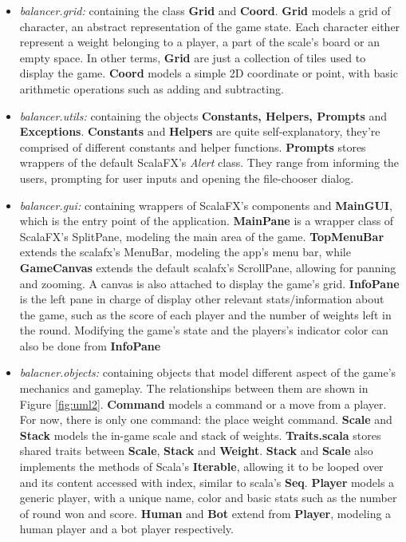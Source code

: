 \documentclass[12pt]{article}
\begin{document}
\begin{itemize}

  \item \textit{balancer.grid:} containing the class \textbf{Grid} and
    \textbf{Coord}. \textbf{Grid} models a grid of character, an abstract
    representation of the game state. Each character either represent a weight
    belonging to a player, a part of the scale's board or an empty space. In
    other terms, \textbf{Grid} are just a collection of tiles used to display
    the game. \textbf{Coord} models a simple 2D coordinate or point, with basic
    arithmetic operations such as adding and subtracting.

  \item \textit{balancer.utils:} containing the objects \textbf{Constants, Helpers,
    Prompts} and \textbf{Exceptions}. \textbf{Constants} and \textbf{Helpers}
    are quite self-explanatory, they're comprised of different constants and
    helper functions. \textbf{Prompts} stores wrappers of the default ScalaFX's
    \textit{Alert} class. They range from informing the users, prompting for
    user inputs and opening the file-chooser dialog.

  \item \textit{balancer.gui:} containing wrappers of ScalaFX's components and
    \textbf{MainGUI}, which is the entry point of the application.
    \textbf{MainPane} is a wrapper class of ScalaFX's SplitPane, modeling the
    main area of the game. \textbf{TopMenuBar} extends the scalafx's MenuBar,
    modeling the app's menu bar, while \textbf{GameCanvas} extends the default
    scalafx's ScrollPane, allowing for panning and zooming. A canvas is also
    attached to display the game's grid. \textbf{InfoPane} is the left pane in
    charge of display other relevant stats/information about the game, such as
    the score of each player and the number of weights left in the round.
    Modifying the game's state and the players's indicator color can also be
    done from \textbf{InfoPane} 

  \item \textit{balacner.objects:} containing objects that model different
    aspect of the game's mechanics and gameplay. The relationships between them
    are shown in Figure \ref{fig:uml2}. \textbf{Command} models a command or a
    move from a player. For now, there is only one command: the place weight
    command. \textbf{Scale} and \textbf{Stack} models the in-game scale and
    stack of weights. \textbf{Traits.scala} stores shared traits between
    \textbf{Scale}, \textbf{Stack} and \textbf{Weight}.  \textbf{Stack} and
    \textbf{Scale} also implements the methods of Scala's \textbf{Iterable},
    allowing it to be looped over and its content accessed with index, similar
    to scala's \textbf{Seq}.  \textbf{Player} models a generic player, with a
    unique name, color and basic stats such as the number of round won and
    score.  \textbf{Human} and \textbf{Bot} extend from \textbf{Player},
    modeling a human player and a bot player respectively.

\end{itemize}
\end{document}
